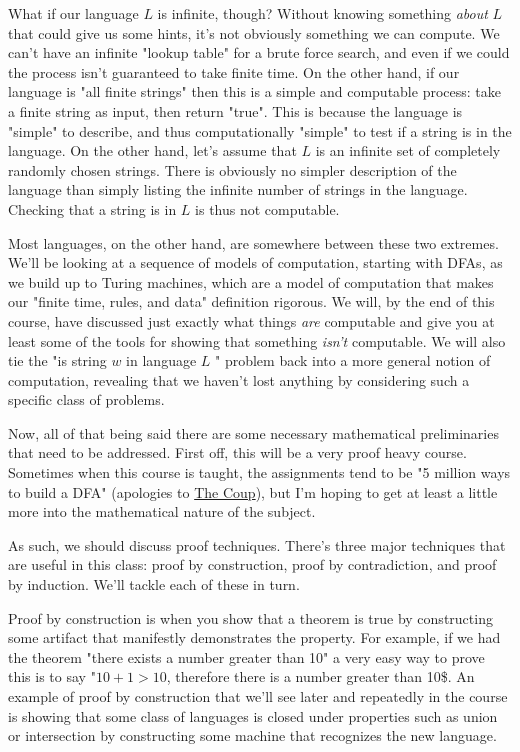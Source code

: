 \documentclass[11pt]{article}
\begin{document}
What if our language $L$ is infinite, though? Without knowing something \emph{about} $L$ that could give us some hints, it's not obviously something we can compute. We can't have an infinite "lookup table" for a brute force search, and even if we could the process isn't guaranteed to take finite time. On the other hand, if our language is "all finite strings" then this is a simple and computable process: take a finite string as input, then return "true". This is because the language is "simple" to describe, and thus computationally "simple" to test if a string is in the language. On the other hand, let's assume that $L$ is an infinite set of completely randomly chosen strings. There is obviously no simpler description of the language than simply listing the infinite number of strings in the language. Checking that a string is in $L$ is thus not computable.

Most languages, on the other hand, are somewhere between these two extremes. We'll be looking at a sequence of models of computation, starting with DFAs, as we build up to Turing machines, which are a model of computation that makes our "finite time, rules, and data" definition rigorous. We will, by the end of this course, have discussed just exactly what things \emph{are} computable and give you at least some of the tools for showing that something \emph{isn't} computable. We will also tie the "is string $w$ in language $L$ " problem back into a more general notion of computation, revealing that we haven't lost anything by considering such a specific class of problems.

Now, all of that being said there are some necessary mathematical preliminaries that need to be addressed. First off, this will be a very proof heavy course. Sometimes when this course is taught, the assignments tend to be "5 million ways to build a DFA" (apologies to \href{https://www.youtube.com/watch?v=RQthFDpYCys}{The Coup}), but I'm hoping to get at least a little more into the mathematical nature of the subject. 

As such, we should discuss proof techniques. There's three major techniques that are useful in this class: proof by construction, proof by contradiction, and proof by induction. We'll tackle each of these in turn. 

Proof by construction is when you show that a theorem is true by constructing some artifact that manifestly demonstrates the property. For example, if we had the theorem "there exists a number greater than 10" a very easy way to prove this is to say "$10+1 > 10$, therefore there is a number greater than 10\$. An example of proof by construction that we'll see later and repeatedly in the course is showing that some class of languages is closed under properties such as union or intersection by constructing some machine that recognizes the new language.
\end{document}
